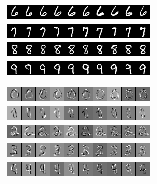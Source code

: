 \begin{figure}
\begin{subfigure}{0.45\textwidth}
\begin{tabular}{c}
  \includegraphics[width=0.90\linewidth]{predoc/images/6_ppv.png}\\
  \includegraphics[width=0.90\linewidth]{predoc/images/7_ppv.png}\\
  \includegraphics[width=0.90\linewidth]{predoc/images/8_ppv.png}\\
  \includegraphics[width=0.90\linewidth]{predoc/images/9_ppv.png}
\end{tabular}
\label{fig:mnistppv}
\end{subfigure}
\begin{subfigure}{0.45\textwidth}
\begin{tabular}{c}
  \includegraphics[width=0.9\linewidth]{predoc/images/0_eigenvectors.png}\\
  \includegraphics[width=0.90\linewidth]{predoc/images/1_eigenvectors.png}\\
  \includegraphics[width=0.90\linewidth]{predoc/images/2_eigenvectors.png}\\
  \includegraphics[width=0.90\linewidth]{predoc/images/3_eigenvectors.png}\\
  \includegraphics[width=0.90\linewidth]{predoc/images/4_eigenvectors.png}\\

\end{tabular}
\end{subfigure}
\end{figure}

